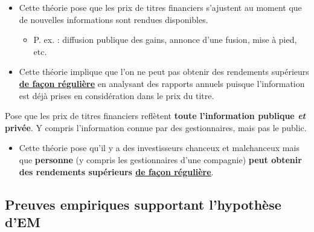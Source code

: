 \documentclass[10pt, french]{article}
\begin{document}
\begin{multicols*}{2}
\begin{definitionNOHFILLsub}
\begin{itemize}
	\item	Cette théorie pose que les prix de titres financiers s'ajustent au moment que de nouvelles informations sont rendues disponibles.
		\begin{itemize}
		\item	P. ex. : diffusion publique des gains, annonce d'une fusion, mise à pied, etc.
		\end{itemize}
	\item	Cette théorie implique que l'on ne peut pas obtenir des rendements supérieurs \underline{\textbf{de façon régulière}} en analysant des rapports annuels puisque l'information est déjà prises en considération dans le prix du titre.
\end{itemize}
\end{definitionNOHFILLsub}


\begin{definitionNOHFILLsub}
Pose que les prix de titres financiers reflètent \textbf{toute l'information publique \textit{et} privée}. Y compris l'information connue par des gestionnaires, mais pas le public.

\begin{itemize}
	\item	Cette théorie pose qu'il y a des investisseurs chanceux et malchanceux mais que \textbf{personne} (y compris les gestionnaires d'une compagnie) \textbf{peut obtenir des rendements supérieurs \underline{de façon régulière}}.
\end{itemize}
\end{definitionNOHFILLsub}


\pagebreak
\subsection{Preuves empiriques supportant l'hypothèse d'EM}

\end{multicols*}
\end{document}
